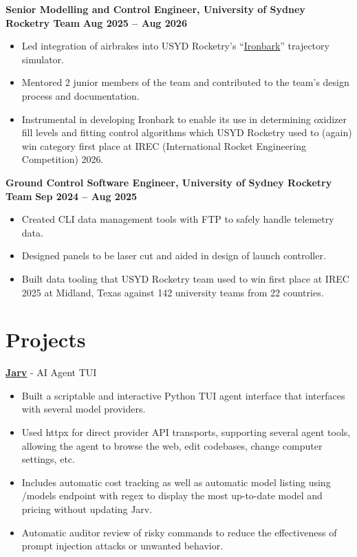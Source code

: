 \documentclass[10pt, letterpaper]{article}
\begin{document}
\textbf{Senior Modelling and Control Engineer, University of Sydney Rocketry Team} \hfill \textbf{Aug 2025 -- Aug 2026}
\begin{itemize}
    \item Led integration of airbrakes into USYD Rocketry's ``\href{https://rocketry-eng.sydney.edu.au/ironbark/}{Ironbark}'' trajectory simulator.
    \item Mentored 2 junior members of the team and contributed to the team's design process and documentation.
    \item Instrumental in developing Ironbark to enable its use in determining oxidizer fill levels and fitting control algorithms which USYD Rocketry used to (again) win category first place at IREC (International Rocket Engineering Competition) 2026.
\end{itemize}
\textbf{Ground Control Software Engineer, University of Sydney Rocketry Team} \hfill \textbf{Sep 2024 -- Aug 2025}
\begin{itemize}
    \item Created CLI data management tools with FTP to safely handle telemetry data.
    \item Designed panels to be laser cut and aided in design of launch controller.
    \item Built data tooling that USYD Rocketry team used to win first place at IREC 2025 at Midland, Texas against 142 university teams from 22 countries.
\end{itemize}

\section*{Projects}

\href{https://github.com/JamesWHomer/jarv}{\textbf{Jarv}} - AI Agent TUI
\begin{itemize}
    \item Built a scriptable and interactive Python TUI agent interface that interfaces with several model providers.
    \item Used httpx for direct provider API transports, supporting several agent tools, allowing the agent to browse the web, edit codebases, change computer settings, etc.
    \item Includes automatic cost tracking as well as automatic model listing using /models endpoint with regex to display the most up-to-date model and pricing without updating Jarv.
    \item Automatic auditor review of risky commands to reduce the effectiveness of prompt injection attacks or unwanted behavior.
\end{itemize}
\end{document}
